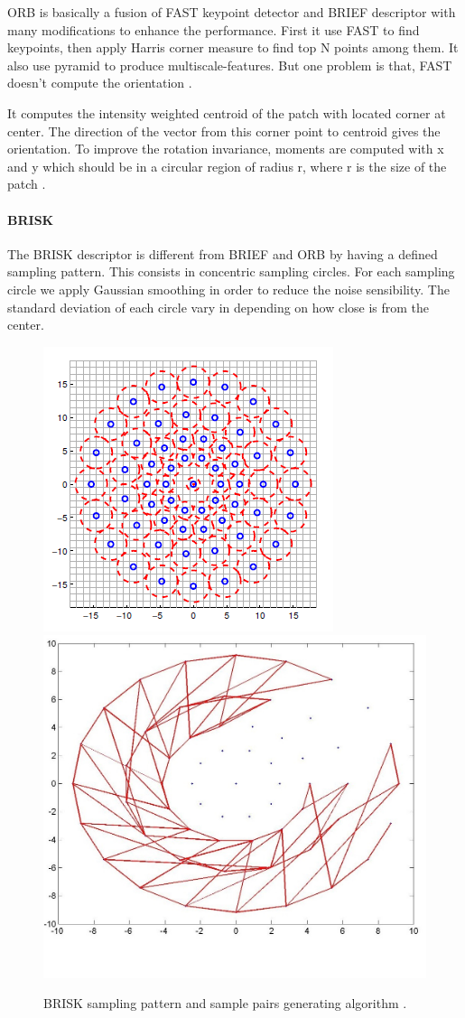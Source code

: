 \documentclass[9pt,shortpaper,twoside,web]{ieeecolor}
\begin{document}
ORB is basically a fusion of FAST keypoint detector and BRIEF descriptor with many modifications to enhance the performance. First it use FAST to find keypoints, then apply Harris corner measure to find top N points among them. It also use pyramid to produce multiscale-features. But one problem is that, FAST doesn’t compute the orientation  \cite{b9}.

It computes the intensity weighted centroid of the patch with located corner at center. The direction of the vector from this corner point to centroid gives the orientation. To improve the rotation invariance, moments are computed with x and y which should be in a circular region of radius r, where r is the size of the patch \cite{b9}.
\\

\paragraph{BRISK}
The BRISK descriptor is different from BRIEF and ORB by having a defined sampling pattern. This consists in concentric sampling circles. For each sampling circle we apply Gaussian smoothing in order to reduce the noise sensibility. The standard deviation of each circle vary in depending on how close is from the center.

\begin{figure}[htb]
\includegraphics[width=0.5\columnwidth]{res/fig/BRISKsampling.png}
\includegraphics[width=0.5\columnwidth]{res/fig/BRISKsamplePairs.jpg}
\caption{BRISK sampling pattern and sample pairs generating algorithm \cite{b6}.}
\label{fig8}
\end{figure}
\end{document}
